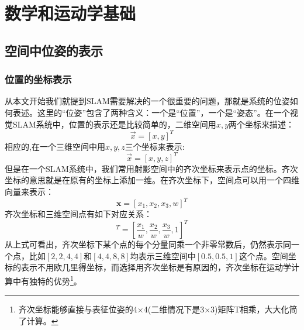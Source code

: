 \chapter{数学和运动学基础}
\section{空间中位姿的表示}
\subsection{位置的坐标表示}
从本文开始我们就提到SLAM需要解决的一个很重要的问题，那就是系统的位姿如何表述。这里的“位姿”包含了两种含义：一个是“位置”，一个是“姿态”。在一个视觉SLAM系统中，位置的表示还是比较简单的，二维空间用$x,y$两个坐标来描述：
\begin{equation}
	\vec x = [x,y]^T
\end{equation}
相应的,在一个三维空间中用$x,y,z$三个坐标来表示:
\begin{equation}
	\vec x = [x,y,z]^T
\end{equation}
但是在一个SLAM系统中，我们常用射影空间中的齐次坐标来表示点的坐标。齐次坐标的意思就是在原有的坐标上添加一维。在齐次坐标下，空间点可以用一个四维向量来表示：
\begin{equation}
\boldsymbol{x}=\left[x_{1}, x_{2}, x_{3}, w\right]^{T}
\end{equation}
齐次坐标和三维空间点有如下对应关系：
\begin{equation}
	[x,y,z,1]^T=\left[\frac{x_{1}}{w}, \frac{x_{2}}{w}, \frac{x_{3}}{w}, 1\right]^{T}
\end{equation}
从上式可看出，齐次坐标下某个点的每个分量同乘一个非零常数后，仍然表示同一个点，比如$[2,2,4,4]$和$[4,4,8,8]$均表示三维空间中$[0.5,0.5,1]$这个点。空间坐标的表示不用欧几里得坐标，而选择用齐次坐标是有原因的，齐次坐标在运动学计算中有独特的优势\footnote{齐次坐标能够直接与表征位姿的4$\times$4(二维情况下是3$\times$3)矩阵T相乘，大大化简了计算。}。\par

